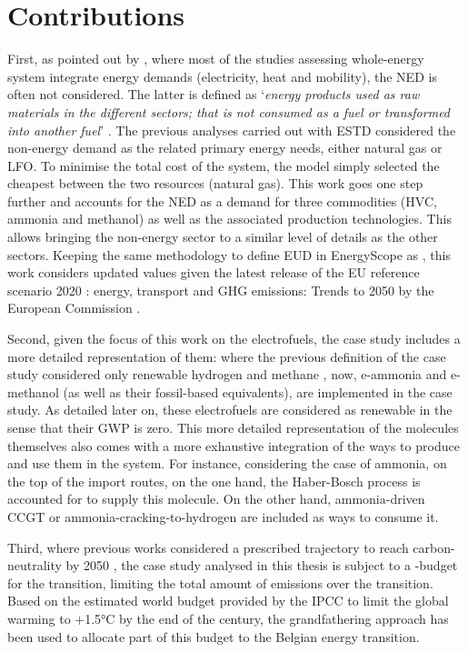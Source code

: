 \section*{Contributions}
\label{sec:cs:contributions}
First, as pointed out by \citet{rixhon2022integration}, where most of the studies assessing whole-energy system integrate energy demands (\ie electricity, heat and mobility), the \acrfull{NED} is often not considered. The latter is defined as ‘\textit{energy products used as raw materials in the different sectors; that is not consumed as a fuel or transformed into another fuel}’ \cite{Eurostat2019}. The previous analyses carried out with \gls{ESTD} considered the non-energy demand as the related primary energy needs, \ie either natural gas or \gls{LFO}. To minimise the total cost of the system, the model simply selected the cheapest between the two resources (\ie natural gas). This work goes one step further and accounts for the \gls{NED} as a demand for three commodities (\ie \gls{HVC}, ammonia and methanol) as well as the associated production technologies. This allows bringing the non-energy sector to a similar level of details as the other sectors.  Keeping the same methodology to define \gls{EUD} in EnergyScope as \citet{Limpens2020}, this work considers updated values given the latest release of the \og EU reference scenario 2020 : energy, transport and GHG emissions: Trends to 2050 \fg by the European Commission \cite{EuropeanCommission2021}.

Second, given the focus of this work on the electrofuels, the case study includes a more detailed representation of them: where the previous definition of the case study considered only renewable hydrogen and methane \cite{limpens2021generating}, now, e-ammonia and e-methanol (as well as their fossil-based equivalents), are implemented in the case study. As detailed later on, these electrofuels are considered as renewable in the sense that their \gls{GWP} is zero. This more detailed representation of the molecules themselves also comes with a more exhaustive integration of the ways to produce and use them in the system. For instance, considering the case of ammonia, on the top of the import routes, on the one hand, the Haber-Bosch process is accounted for to supply this molecule. On the other hand, ammonia-driven \gls{CCGT} or ammonia-cracking-to-hydrogen are included as ways to consume it.

Third, where previous works considered a prescribed  trajectory to reach carbon-neutrality by 2050 \cite{limpens2021generating, limpens2024pathway}, the case study analysed in this thesis is subject to a -budget for the transition, \ie limiting the total amount of emissions over the transition. Based on the estimated world budget provided by the \gls{IPCC} to limit the global warming to +1.5°C by the end of the century, the grandfathering approach has been used to allocate part of this budget to the Belgian energy transition.

